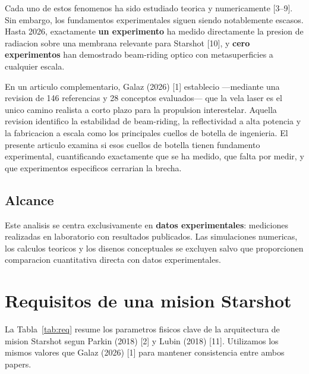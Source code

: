 \documentclass[11pt,a4paper,onecolumn]{article}
\begin{document}
Cada uno de estos fenomenos ha sido estudiado teorica y numericamente [3--9]. Sin embargo, los fundamentos experimentales siguen siendo notablemente escasos. Hasta 2026, exactamente \textbf{un experimento} ha medido directamente la presion de radiacion sobre una membrana relevante para Starshot [10], y \textbf{cero experimentos} han demostrado beam-riding optico con metasuperficies a cualquier escala.

En un articulo complementario, Galaz (2026) [1] establecio ---mediante una revision de 146 referencias y 28 conceptos evaluados--- que la vela laser es el unico camino realista a corto plazo para la propulsion interestelar. Aquella revision identifico la estabilidad de beam-riding, la reflectividad a alta potencia y la fabricacion a escala como los principales cuellos de botella de ingenieria. El presente articulo examina si esos cuellos de botella tienen fundamento experimental, cuantificando exactamente que se ha medido, que falta por medir, y que experimentos especificos cerrarian la brecha.

\subsection{Alcance}

Este analisis se centra exclusivamente en \textbf{datos experimentales}: mediciones realizadas en laboratorio con resultados publicados. Las simulaciones numericas, los calculos teoricos y los disenos conceptuales se excluyen salvo que proporcionen comparacion cuantitativa directa con datos experimentales.

\section{Requisitos de una mision Starshot}

La Tabla~\ref{tab:req} resume los parametros fisicos clave de la arquitectura de mision Starshot segun Parkin (2018) [2] y Lubin (2018) [11]. Utilizamos los mismos valores que Galaz (2026) [1] para mantener consistencia entre ambos papers.
\end{document}
